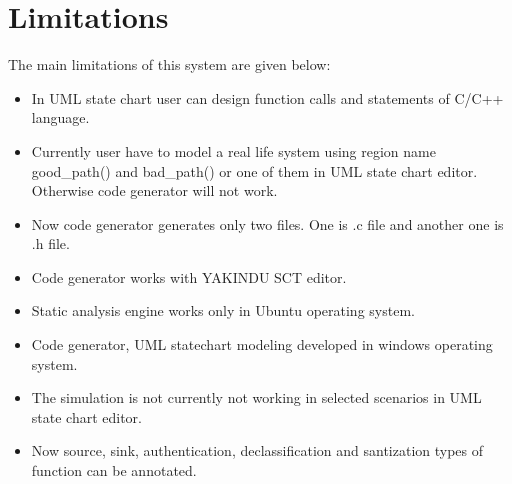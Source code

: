 \chapter{Limitations}
The main limitations of this system are given below:
\begin{itemize}
	\item In UML state chart user can design function calls and statements of C/C++ language.
	
	\item Currently user have to model a real life system using region name good\_path() and bad\_path() or one of them in UML state chart editor. Otherwise code generator will not work.
	
	\item Now code generator generates only two files. One is .c file and another one is .h file.
	
	\item Code generator works with YAKINDU SCT editor.
	
	\item Static analysis engine works only in Ubuntu operating system.
	
	\item Code generator, UML statechart modeling developed in windows operating system.
	
	\item The simulation is not currently not working in selected scenarios in UML state chart editor.
	
	\item Now source, sink, authentication, declassification and santization types of function can be annotated. 
	
\end{itemize}